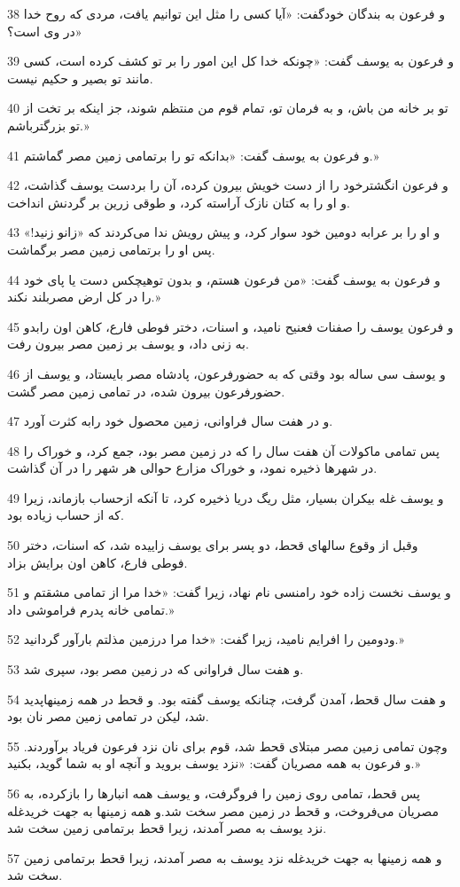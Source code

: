 \par 38 و فرعون به بندگان خودگفت: «آیا کسی را مثل این توانیم یافت، مردی که روح خدا در وی است؟»
\par 39 و فرعون به یوسف گفت: «چونکه خدا کل این امور را بر تو کشف کرده است، کسی مانند تو بصیر و حکیم نیست.
\par 40 تو بر خانه من باش، و به فرمان تو، تمام قوم من منتظم شوند، جز اینکه بر تخت از تو بزرگترباشم.»
\par 41 و فرعون به یوسف گفت: «بدانکه تو را برتمامی زمین مصر گماشتم.»
\par 42 و فرعون انگشترخود را از دست خویش بیرون کرده، آن را بردست یوسف گذاشت، و او را به کتان نازک آراسته کرد، و طوقی زرین بر گردنش انداخت.
\par 43 و او را بر عرابه دومین خود سوار کرد، و پیش رویش ندا می‌کردند که «زانو زنید!» پس او را برتمامی زمین مصر برگماشت.
\par 44 و فرعون به یوسف گفت: «من فرعون هستم، و بدون توهیچکس دست یا پای خود را در کل ارض مصربلند نکند.»
\par 45 و فرعون یوسف را صفنات فعنیح نامید، و اسنات، دختر فوطی فارع، کاهن اون رابدو به زنی داد، و یوسف بر زمین مصر بیرون رفت.
\par 46 و یوسف سی ساله بود وقتی که به حضورفرعون، پادشاه مصر بایستاد، و یوسف از حضورفرعون بیرون شده، در تمامی زمین مصر گشت.
\par 47 و در هفت سال فراوانی، زمین محصول خود رابه کثرت آورد.
\par 48 پس تمامی ماکولات آن هفت سال را که در زمین مصر بود، جمع کرد، و خوراک را در شهرها ذخیره نمود، و خوراک مزارع حوالی هر شهر را در آن گذاشت.
\par 49 و یوسف غله بیکران بسیار، مثل ریگ دریا ذخیره کرد، تا آنکه ازحساب بازماند، زیرا که از حساب زیاده بود.
\par 50 وقبل از وقوع سالهای قحط، دو پسر برای یوسف زاییده شد، که اسنات، دختر فوطی فارع، کاهن اون برایش بزاد.
\par 51 و یوسف نخست زاده خود رامنسی نام نهاد، زیرا گفت: «خدا مرا از تمامی مشقتم و تمامی خانه پدرم فراموشی داد.»
\par 52 ودومین را افرایم نامید، زیرا گفت: «خدا مرا درزمین مذلتم بارآور گردانید.»
\par 53 و هفت سال فراوانی که در زمین مصر بود، سپری شد.
\par 54 و هفت سال قحط، آمدن گرفت، چنانکه یوسف گفته بود. و قحط در همه زمینهاپدید شد، لیکن در تمامی زمین مصر نان بود.
\par 55 وچون تمامی زمین مصر مبتلای قحط شد، قوم برای نان نزد فرعون فریاد برآوردند. و فرعون به همه مصریان گفت: «نزد یوسف بروید و آنچه او به شما گوید، بکنید.»
\par 56 پس قحط، تمامی روی زمین را فروگرفت، و یوسف همه انبارها را بازکرده، به مصریان می‌فروخت، و قحط در زمین مصر سخت شد.و همه زمینها به جهت خریدغله نزد یوسف به مصر آمدند، زیرا قحط برتمامی زمین سخت شد.
\par 57 و همه زمینها به جهت خریدغله نزد یوسف به مصر آمدند، زیرا قحط برتمامی زمین سخت شد.
 
